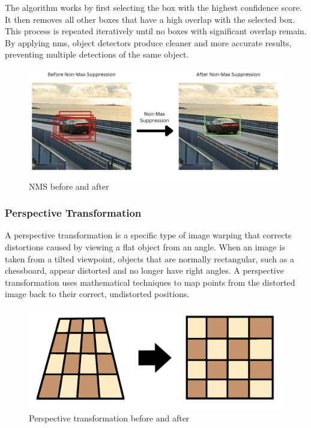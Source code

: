 The algorithm works by first selecting the box with the highest confidence score. It then removes all other boxes that have a high overlap with the selected box. This process is repeated iteratively until no boxes with significant overlap remain. By applying \gls{nms}, object detectors produce cleaner and more accurate results, preventing multiple detections of the same object.
\cite{thepythoncode:nms}


\begin{figure}[h!]
    \centering
    \includegraphics[width=0.75\linewidth]{figures/theory/image-recognition/nms.png}
    \caption[NMS before and after]{NMS before and after \cite{thepythoncode:nms}}
    \label{fig:nms}
\end{figure}


\subsubsection*{Perspective Transformation}

A perspective transformation is a specific type of image warping that corrects distortions caused by viewing a flat object from an angle. When an image is taken from a tilted viewpoint, objects that are normally rectangular, such as a chessboard, appear distorted and no longer have right angles. A perspective transformation uses mathematical techniques to map points from the distorted image back to their correct, undistorted positions. \cite{nvidia:perspective-transform}


\begin{figure}[h!]
    \centering
    \includegraphics[width=0.75\linewidth]{figures/theory/image-recognition/perspective-transformation.png}
    \caption[Perspective transformation before and after]{Perspective transformation before and after  \cite{nvidia:perspective-transform}}
    \label{fig:perspective-transformation}
\end{figure}



